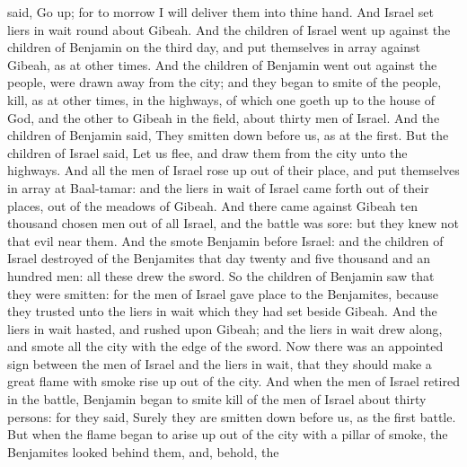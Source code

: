 {{}
said, Go
up; for to
morrow I will
deliver them into thine
hand.
And
Israel
set liers in
wait round
about
Gibeah.
And the
children of
Israel went
up against the
children of
Benjamin on the
third
day, and put themselves in
array against
Gibeah, as at other
times.
And the
children of
Benjamin went
out
against the
people,
{} were drawn
away from the
city; and they
began to
smite of the
people,
{}
kill, as at other
times, in the
highways, of which
one goeth
up to the
house of
God, and the
other to
Gibeah in the
field, about
thirty
men of
Israel.
And the
children of
Benjamin
said, They
{} smitten
down
before us, as at the
first. But the
children of
Israel
said, Let us
flee, and
draw them from the
city unto the
highways.
And all the
men of
Israel rose
up out of their
place, and put themselves in
array at
Baal-tamar: and the liers in
wait of
Israel came
forth out of their
places,
{} out of the
meadows of
Gibeah.
And there
came
against
Gibeah
ten
thousand
chosen
men out of all
Israel, and the
battle was
sore: but they
knew not that
evil
{}
near them.
And the
{}
smote
Benjamin
before
Israel: and the
children of
Israel
destroyed of the
Benjamites that
day
twenty and
five
thousand and an
hundred
men: all these
drew the
sword.
So the
children of
Benjamin
saw that they were
smitten: for the
men of
Israel
gave
place to the
Benjamites, because they
trusted unto the liers in
wait which they had
set beside
Gibeah.
And the liers in
wait
hasted, and
rushed upon
Gibeah; and the liers in
wait drew
{}
along, and
smote all the
city with the
edge of the
sword.
Now there was an appointed
sign between the
men of
Israel
and the liers in
wait, that they should make a
great
flame with
smoke rise
up out of the
city.
And when the
men of
Israel
retired in the
battle,
Benjamin
began to
smite
{}
kill of the
men of
Israel about
thirty
persons: for they
said,
Surely they are smitten
down
before us, as
{} the
first
battle.
But when the
flame
began to arise
up out of the
city with a
pillar of
smoke, the
Benjamites
looked
behind them, and, behold, the
}
